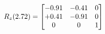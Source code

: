 \documentclass[preview]{standalone}
\begin{document}
\begin{align*}
\special{dvisvgm:raw <g id='unique000'>}R_{z}(2.72) = \begin{bmatrix}-0.91 & -0.41 & 0 \\+0.41 & -0.91 & 0 \\0 & 0 & 1\end{bmatrix}\special{dvisvgm:raw </g>}
\end{align*}
\end{document}

